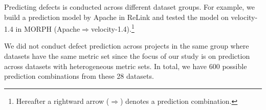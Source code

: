Predicting defects is conducted across different dataset
groups.
For example, we build a prediction model by Apache in ReLink and tested the
model on velocity-1.4 in MORPH
(Apache$\Rightarrow$velocity-1.4).\footnote{Hereafter a rightward arrow
($\Rightarrow$) denotes a prediction combination.}

We did not conduct defect prediction across projects in the same group
where datasets have the same metric set since the focus of our study is on prediction
across datasets with heterogeneous metric sets.
In total, we have 600 possible prediction combinations from these 28 datasets.

% 	
% 
